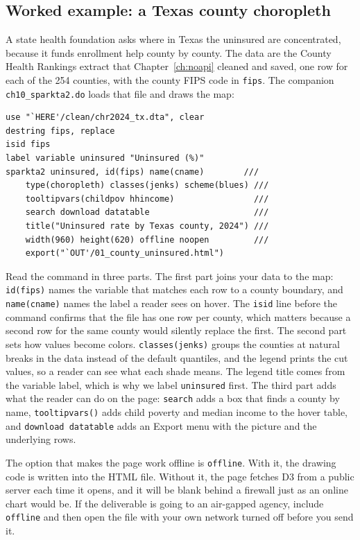 \subsection{Worked example: a Texas county choropleth}\label{sec:sp2-county}
A state health foundation asks where in Texas the uninsured are concentrated, because it funds enrollment help county by county. The data are the County Health Rankings extract that Chapter~\ref{ch:noapi} cleaned and saved, one row for each of the 254 counties, with the county FIPS code in \texttt{fips}. The companion \texttt{ch10\_sparkta2.do} loads that file and draws the map:
\par
{\footnotesize
\begin{verbatim}
use "`HERE'/clean/chr2024_tx.dta", clear
destring fips, replace
isid fips
label variable uninsured "Uninsured (%)"
sparkta2 uninsured, id(fips) name(cname)        ///
    type(choropleth) classes(jenks) scheme(blues) ///
    tooltipvars(childpov hhincome)                ///
    search download datatable                     ///
    title("Uninsured rate by Texas county, 2024") ///
    width(960) height(620) offline noopen         ///
    export("`OUT'/01_county_uninsured.html")
\end{verbatim}
}
Read the command in three parts. The first part joins your data to the map: \texttt{id(fips)} names the variable that matches each row to a county boundary, and \texttt{name(cname)} names the label a reader sees on hover. The \texttt{isid} line before the command confirms that the file has one row per county, which matters because a second row for the same county would silently replace the first. The second part sets how values become colors. \texttt{classes(jenks)} groups the counties at natural breaks in the data instead of the default quantiles, and the legend prints the cut values, so a reader can see what each shade means. The legend title comes from the variable label, which is why we label \texttt{uninsured} first. The third part adds what the reader can do on the page: \texttt{search} adds a box that finds a county by name, \texttt{tooltipvars()} adds child poverty and median income to the hover table, and \texttt{download datatable} adds an Export menu with the picture and the underlying rows.

The option that makes the page work offline is \texttt{offline}. With it, the drawing code is written into the HTML file. Without it, the page fetches D3 from a public server each time it opens, and it will be blank behind a firewall just as an online chart would be. If the deliverable is going to an air-gapped agency, include \texttt{offline} and then open the file with your own network turned off before you send it.


